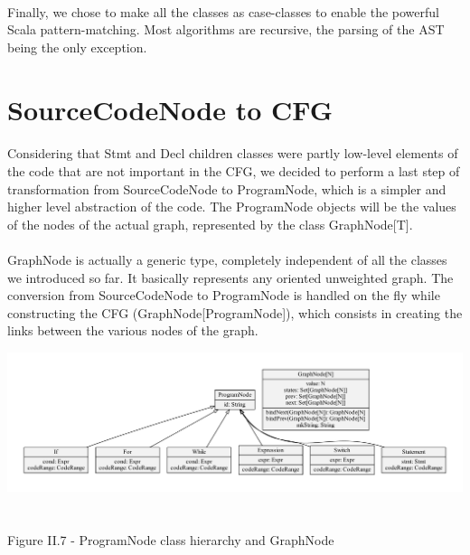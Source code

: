 \documentclass{report}
\begin{document}
\paragraph{}
\hspace{4mm}Finally, we chose to make all the classes as case-classes to enable the powerful Scala pattern-matching.
Most algorithms are recursive, the parsing of the AST being the only exception.

\section{SourceCodeNode to CFG}

\paragraph{}
\hspace{4mm}Considering that Stmt and Decl children classes were partly low-level elements of the code that are not important
in the CFG, we decided to perform a last step of transformation from SourceCodeNode to ProgramNode, which is a simpler and higher level abstraction of the code.
The ProgramNode objects will be the values of the nodes of the actual graph, represented by the class GraphNode[T].

\paragraph{}
\hspace{4mm}GraphNode is actually a generic type, completely independent of all the classes we introduced so far.
It basically represents any oriented unweighted graph. The conversion from SourceCodeNode to
ProgramNode is handled on the fly while constructing the CFG (GraphNode[ProgramNode]), which
consists in creating the links between the various nodes of the graph.

\begin{center}
\includegraphics[scale=0.5]{data/CFG_classes}
~\\~\\Figure II.7 - ProgramNode class hierarchy and GraphNode
\end{center}
\end{document}
